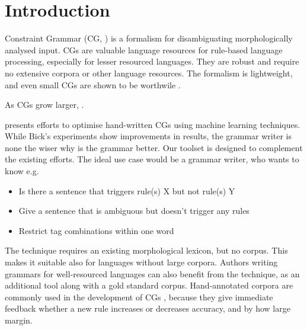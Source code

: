 \section{Introduction}
\label{sec:intro}

Constraint Grammar (CG, \cite{karlsson1995constraint})
is a formalism for disambiguating morphologically analysed input.
CGs are valuable language resources for rule-based language processing, especially for lesser resourced languages. They are robust and require no extensive corpora or other language resources. The formalism is lightweight, and even small CGs are shown to be worthwile \cite{lene_trond2011}.

As CGs grow larger, .

\cite{bick2013tuning} presents efforts to optimise hand-written CGs using machine learning techniques.
While Bick's experiments show improvements in results, the grammar writer is none the wiser why is the grammar better.
Our toolset is designed to complement the existing efforts.
The ideal use case would be a grammar writer, who wants to know e.g.

\begin{itemize}
\item Is there a sentence that triggers rule(s) X but not rule(s) Y
\item Give a sentence that is ambiguous but doesn't trigger any rules
\item Restrict tag combinations within one word
\end{itemize}

The technique requires an existing morphological lexicon, but no corpus.
This makes it suitable also for languages without large corpora.
Authors writing grammars for well-resourced languages can also benefit from the technique, as an additional tool along with a gold standard corpus. 
Hand-annotated corpora are commonly used in the development of CGs
 \cite{voutilainen99}, because they give immediate feedback whether a new rule
increases or decreases accuracy, and by how large margin. 








